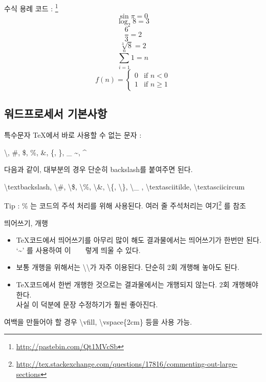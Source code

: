 \documentclass[12pt]{beamer}
\begin{document}
\begin{frame}{수식 용례}
	코드 : \footnote{\url{http://pastebin.com/Qt1MVcSb}}
	$$ \sin{\pi} = 0 $$
	$$ \log_{2}{8} = 3 $$
	$$ \frac{6}{3} = 2 $$
	$$ \sqrt[3]{8} = 2 $$
	$$ \sum_{i=1}^{n}{1} = n $$
	\begin{equation}
	f(n) = \begin{cases} 0 &\mbox{if } n<0 \\ 
	1 & \mbox{if } n\geq 1 \end{cases}
	\end{equation}
\end{frame}
\subsection{워드프로세서 기본사항}
\begin{frame}{특수문자}
	\TeX 에서 바로 사용할 수 없는 문자 : 
	\begin{center}
		\textbackslash, \#, \$, \%, \&, \{, \}, \_ \textasciitilde, \textasciicircum
	\end{center}
	다음과 같이, 대부분의 경우 단순히 backslash를 붙여주면 된다.
	\begin{center}
		\textbackslash textbackslash, \textbackslash\#, \textbackslash\$, \textbackslash\%, \textbackslash\&, \textbackslash\{, \textbackslash\}, \textbackslash \_ , \textbackslash textasciitilde, \textbackslash textasciicircum 
	\end{center}
	Tip : \% 는 코드의 주석 처리를 위해 사용된다. 여러 줄 주석처리는 여기\footnote{\url{http://tex.stackexchange.com/questions/17816/commenting-out-large-sections}} 를 참조
\end{frame}
\begin{frame}{띄어쓰기, 개행}
	\begin{itemize}
		\item \TeX 코드에서 띄어쓰기를 아무리 많이 해도 결과물에서는 띄어쓰기가 한번만 된다. \\
		`\textasciitilde' 를 사용하여 이~~~~렇게 띄울 수 있다.
		\item 보통 개행을 위해서는 \textbackslash\textbackslash 가 자주 이용된다. 단순히 2회 개행해 놓아도 된다.
		\item \TeX 코드에서 한번 개행한 것으로는 결과물에서는 개행되지 않는다. 2회 개행해야 한다. \\
		사실 이 덕분에 문장 수정하기가 훨씬 좋아진다. 
	\end{itemize}
	여백을 만들어야 할 경우 \textbackslash vfill, \textbackslash vspace\{2cm\} 등을 사용 가능.
	
\end{frame}
\end{document}
